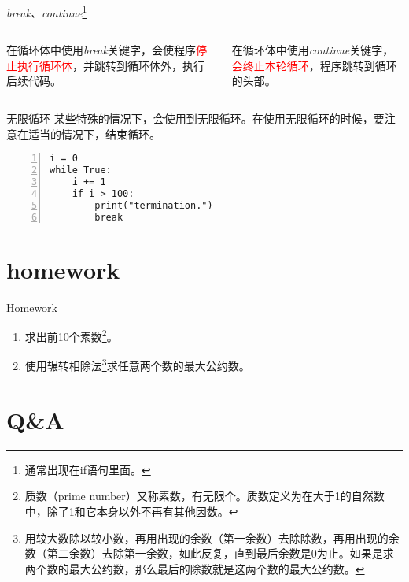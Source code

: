 \documentclass{beamer}
\begin{document}
\begin{frame}{\textit{break、continue}\footnote{通常出现在if语句里面。}}
\begin{columns}

在循环体中使用\textit{break}关键字，会使程序\textcolor{red}{停止执行循环体}，并跳转到循环体外，执行后续代码。

在循环体中使用\textit{continue}关键字，\textcolor{red}{会终止本轮循环}，程序跳转到循环的头部。
\end{columns}
\end{frame}
\begin{frame}[fragile]{无限循环}
某些特殊的情况下，会使用到无限循环。在使用无限循环的时候，要注意在适当的情况下，结束循环。
\begin{Verbatim}[numbers=left,frame=single,rulecolor=\color{red}]
i = 0
while True:
    i += 1
    if i > 100:
        print("termination.")
        break
\end{Verbatim}
\end{frame}

\section{homework}
\begin{frame}{Homework}
\begin{enumerate}
\item
求出前10个素数\footnote{质数（prime number）又称素数，有无限个。质数定义为在大于1的自然数中，除了1和它本身以外不再有其他因数。}。
\item
使用辗转相除法\footnote{用较大数除以较小数，再用出现的余数（第一余数）去除除数，再用出现的余数（第二余数）去除第一余数，如此反复，直到最后余数是0为止。如果是求两个数的最大公约数，那么最后的除数就是这两个数的最大公约数。}求任意两个数的最大公约数。
\end{enumerate}
\end{frame}
\section{Q\&A}
\begin{frame}
\end{frame}


%
\end{document}
